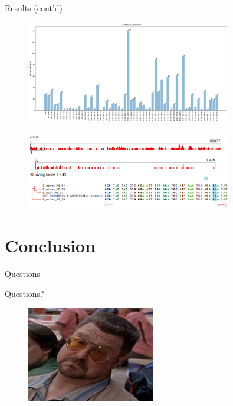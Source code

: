 \documentclass{beamer}
\begin{document}
\begin{frame}{Results (cont'd)}
	\begin{figure}[ht]
		\centering
		\includegraphics[width=0.8\textwidth,height=0.3\textheight]{img/Lactobacillus-johnsonii.png}
		\caption*{\label{fig:Lactobacillus-hist}}
	\end{figure}
	\vspace{-1cm}
	\begin{figure}[ht]
		\centering
		\includegraphics[width=0.8\textwidth,height=0.4\textheight]{img/Lactobacillus-johnsonii-msa.png}
		\caption*{\label{fig:Lactobacillus-msa}}
	\end{figure}

\end{frame}


\section{Conclusion}
\begin{frame}{Questions}
	\begin{center}
		\Huge{Questions?}
	\end{center}
	\begin{figure}
		\centering
		\includegraphics[width=0.5\textwidth, height=1.0\textheight, keepaspectratio]{img/walter.jpg}
	\end{figure}
\end{frame}
\end{document}
